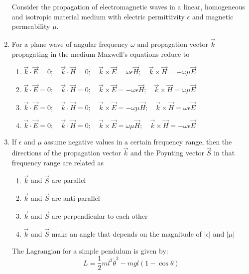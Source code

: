\documentclass[journal,12pt,onecolumn]{IEEEtran}
\theoremstyle{remark}
\begin{document}
\begin{enumerate}
\par\noindent Consider the propagation of electromagnetic waves in a linear, homogeneous and isotropic material medium with electric permittivity $\epsilon$ and magnetic permeability $\mu$.

\item For a plane wave of angular frequency $\omega$ and propagation vector $\vec{k}$ propagating in the medium Maxwell's equations reduce to\hfill{}

\begin{enumerate}
	\item $\vec{k} \cdot \vec{E} = 0; \quad \vec{k} \cdot \vec{H} = 0; \quad \vec{k} \times \vec{E} = \omega\epsilon\vec{H}; \quad \vec{k} \times \vec{H} = -\omega\mu\vec{E}$
	\item $\vec{k} \cdot \vec{E} = 0; \quad \vec{k} \cdot \vec{H} = 0; \quad \vec{k} \times \vec{E} = -\omega\epsilon\vec{H}; \quad \vec{k} \times \vec{H} = \omega\mu\vec{E}$
	\item $\vec{k} \cdot \vec{E} = 0; \quad \vec{k} \cdot \vec{H} = 0; \quad \vec{k} \times \vec{E} = -\omega\mu\vec{H}; \quad \vec{k} \times \vec{H} = \omega\epsilon\vec{E}$
	\item $\vec{k} \cdot \vec{E} = 0; \quad \vec{k} \cdot \vec{H} = 0; \quad \vec{k} \times \vec{E} = \omega\mu\vec{H}; \quad \vec{k} \times \vec{H} = -\omega\epsilon\vec{E}$
\end{enumerate}

\item If $\epsilon$ and $\mu$ assume negative values in a certain frequency range, then the directions of the propagation vector $\vec{k}$ and the Poynting vector $\vec{S}$ in that frequency range are related as\hfill{}

\begin{enumerate}
	\item $\vec{k}$ and $\vec{S}$ are parallel \item $\vec{k}$ and $\vec{S}$ are anti-parallel
	\item $\vec{k}$ and $\vec{S}$ are perpendicular to each other
	\item $\vec{k}$ and $\vec{S}$ make an angle that depends on the magnitude of $|\epsilon|$ and $|\mu|$
\end{enumerate}

\par\noindent The Lagrangian for a simple pendulum is given by:
\[ L = \frac{1}{2}ml^2\dot{\theta}^2 - mgl(1-\cos\theta) \]


\end{enumerate}
\end{document}
